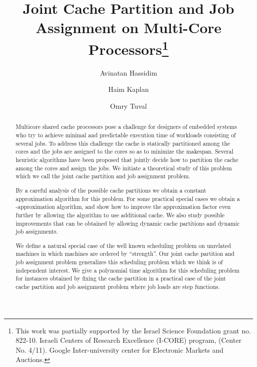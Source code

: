 \documentclass[11pt]{article}
\begin{document}
\title{Joint Cache Partition and Job Assignment on Multi-Core Processors\footnote{This work was partially supported by the
Israel Science Foundation grant no. 822-10.
Israeli Centers of Research Excellence (I-CORE) program, (Center  No. 4/11).
Google Inter-university center for Electronic Markets and Auctions.}}

\author[1]{Avinatan Hassidim}
\author[2]{Haim Kaplan}
\author[2]{Omry Tuval}
\renewcommand\Authands{, }
\date{}


\maketitle
\begin{abstract}
Multicore shared cache processors  pose a challenge for designers of
embedded systems  who try to achieve minimal and predictable
execution time of workloads consisting of several jobs.
To address this challenge the cache is statically partitioned among
the cores and the jobs are assigned to the cores so as to minimize the
makespan.
Several heuristic algorithms have been proposed that jointly decide
how to partition the cache among the cores and assign the jobs. We
initiate a theoretical study of this problem which we call the joint
cache partition and job assignment problem.

By a careful analysis of the possible cache partitions we obtain a
constant approximation algorithm for this problem. For some
practical special cases we obtain a -approximation algorithm, and
show how to improve the approximation factor even further by
allowing the algorithm to use additional cache. We also study
possible improvements that can be obtained by allowing dynamic cache
partitions and dynamic job assignments.

We define a natural special case of the well known scheduling
problem on unrelated machines in which machines are ordered by
``strength''. Our joint cache partition and job assignment problem
generalizes this scheduling problem which we think is of independent
interest. We give a polynomial time algorithm for this scheduling
problem for instances obtained  by fixing the cache partition in a
practical case of the joint cache partition and job assignment problem where job loads are step functions.
\end{abstract}
\end{document}
